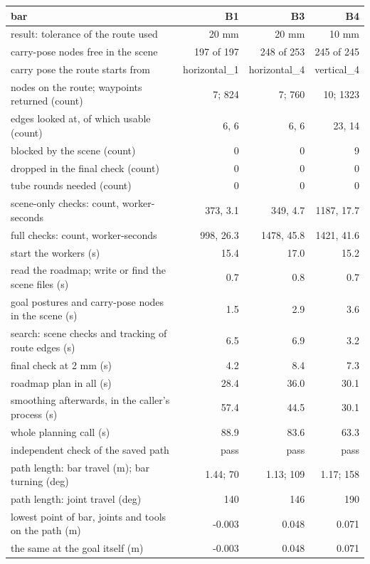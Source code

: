 \begin{tabular}{@{}>{\raggedright\arraybackslash}p{7.4cm} rrr@{}}
\toprule
bar & B1 & B3 & B4 \\
\midrule
result: tolerance of the route used & 20 mm & 20 mm & 10 mm \\
carry-pose nodes free in the scene & 197 of 197 & 248 of 253 & 245 of 245 \\
carry pose the route starts from & horizontal\_1 & horizontal\_4 & vertical\_4 \\
nodes on the route; waypoints returned (count) & 7; 824 & 7; 760 & 10; 1323 \\
edges looked at, of which usable (count) & 6, 6 & 6, 6 & 23, 14 \\
\quad blocked by the scene (count) & 0 & 0 & 9 \\
\quad dropped in the final check (count) & 0 & 0 & 0 \\
tube rounds needed (count) & 0 & 0 & 0 \\
scene-only checks: count, worker-seconds & 373, 3.1 & 349, 4.7 & 1187, 17.7 \\
full checks: count, worker-seconds & 998, 26.3 & 1478, 45.8 & 1421, 41.6 \\
\midrule
start the workers (s) & 15.4 & 17.0 & 15.2 \\
read the roadmap; write or find the scene files (s) & 0.7 & 0.8 & 0.7 \\
goal postures and carry-pose nodes in the scene (s) & 1.5 & 2.9 & 3.6 \\
search: scene checks and tracking of route edges (s) & 6.5 & 6.9 & 3.2 \\
final check at 2 mm (s) & 4.2 & 8.4 & 7.3 \\
roadmap plan in all (s) & 28.4 & 36.0 & 30.1 \\
smoothing afterwards, in the caller's process (s) & 57.4 & 44.5 & 30.1 \\
whole planning call (s) & 88.9 & 83.6 & 63.3 \\
\midrule
independent check of the saved path & pass & pass & pass \\
path length: bar travel (m); bar turning (deg) & 1.44; 70 & 1.13; 109 & 1.17; 158 \\
path length: joint travel (deg) & 140 & 146 & 190 \\
lowest point of bar, joints and tools on the path (m) & -0.003 & 0.048 & 0.071 \\
\quad the same at the goal itself (m) & -0.003 & 0.048 & 0.071 \\
\bottomrule
\end{tabular}
